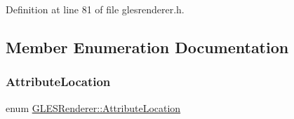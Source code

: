 Definition at line 81 of file glesrenderer.\+h.



\subsection{Member Enumeration Documentation}
\mbox{\label{class_g_l_e_s_renderer_a05f4cf233d5cf60f4d6ea50ddc06a2c4}} 
\subsubsection{\texorpdfstring{AttributeLocation}{AttributeLocation}}
{\footnotesize\ttfamily enum \mbox{\hyperlink{class_g_l_e_s_renderer_a05f4cf233d5cf60f4d6ea50ddc06a2c4}{G\+L\+E\+S\+Renderer\+::\+Attribute\+Location}}}

